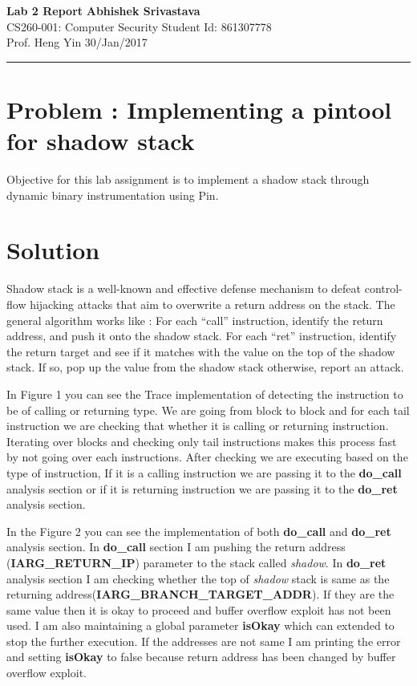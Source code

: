 \documentclass[a4paper, 11pt]{article}
\begin{document}
\noindent
\large\textbf{Lab 2 Report} \hfill \textbf{Abhishek Srivastava} \\
\normalsize CS260-001: Computer Security \hfill Student Id: 861307778 \\
\normalsize Prof. Heng Yin \hfill 30/Jan/2017 \\
\hrule

\section*{Problem : Implementing a pintool for shadow stack}
Objective for this lab assignment is to implement a shadow stack through dynamic binary instrumentation using Pin.

\section*{Solution}
Shadow stack is a well-known and effective defense mechanism to defeat control-flow hijacking attacks that aim to overwrite a return address on the stack. The general algorithm works like : For each “call” instruction, identify the return address, and push it onto the shadow stack. For each “ret” instruction, identify the return target and see if it matches with the value on the top of the shadow stack. If so, pop up the value from the shadow stack otherwise, report an attack.

In Figure 1 you can see the Trace implementation of detecting the instruction to be of calling or returning type. We are going from block to block and for each tail instruction we are checking that whether it is calling or returning instruction. Iterating over blocks and checking only tail instructions makes this process fast by not going over each instructions. After checking we are executing based on the type of instruction, If it is a calling instruction we are passing it to the \textbf{do\_call} analysis section or if it is returning instruction we are passing it to the \textbf{do\_ret} analysis section.

In the Figure 2 you can see the implementation of both \textbf{do\_call} and \textbf{do\_ret} analysis section. In \textbf{do\_call} section I am pushing the return address (\textbf{IARG\_RETURN\_IP}) parameter to the stack called \emph{shadow}. In \textbf{do\_ret} analysis section I am checking whether the top of \emph{shadow} stack is same as the returning address(\textbf{IARG\_BRANCH\_TARGET\_ADDR}). If they are the same value then it is okay to proceed and buffer overflow exploit has not been used. I am also maintaining a global parameter \textbf{isOkay} which can extended to stop the further execution. If the addresses are not same I am printing the error and setting \textbf{isOkay} to false because return address has been changed by buffer overflow exploit.
\end{document}
